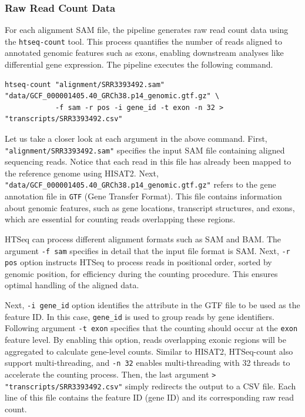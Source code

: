 \subsubsection{Raw Read Count Data}  
For each alignment SAM file, the pipeline generates raw read count data using the \texttt{htseq-count} tool. This process quantifies the number of reads aligned to annotated genomic features such as exons, enabling downstream analyses like differential gene expression. The pipeline executes the following command.
\begin{verbatim}
htseq-count "alignment/SRR3393492.sam" "data/GCF_000001405.40_GRCh38.p14_genomic.gtf.gz" \
            -f sam -r pos -i gene_id -t exon -n 32 > "transcripts/SRR3393492.csv"
\end{verbatim}
Let us take a closer look at each argument in the above command. First, \texttt{"alignment/SRR3393492.sam"} specifies the input SAM file containing aligned sequencing reads. Notice that each read in this file has already been mapped to the reference genome using HISAT2. Next, \texttt{"data/GCF\_000001405.40\_GRCh38.p14\_genomic.gtf.gz"} refers to the gene annotation file in \texttt{GTF} (Gene Transfer Format). This file contains information about genomic features, such as gene locations, transcript structures, and exons, which are essential for counting reads overlapping these regions.

HTSeq can process different alignment formats such as SAM and BAM. The argument \texttt{-f sam} specifies in detail that the input file format is SAM. Next, \texttt{-r pos} option instructs HTSeq to process reads in positional order, sorted by genomic position, for efficiency during the counting procedure. This ensures optimal handling of the aligned data.

Next, \texttt{-i gene\_id} option identifies the attribute in the GTF file to be used as the feature ID. In this case, \texttt{gene\_id} is used to group reads by gene identifiers. Following argument \texttt{-t exon} specifies that the counting should occur at the \texttt{exon} feature level. By enabling this option, reads overlapping exonic regions will be aggregated to calculate gene-level counts. Similar to HISAT2, HTSeq-count also support multi-threading, and \texttt{-n 32} enables multi-threading with 32 threads to accelerate the counting process. Then, the last argument \texttt{> "transcripts/SRR3393492.csv"} simply redirects the output to a CSV file. Each line of this file contains the feature ID (gene ID) and its corresponding raw read count.

